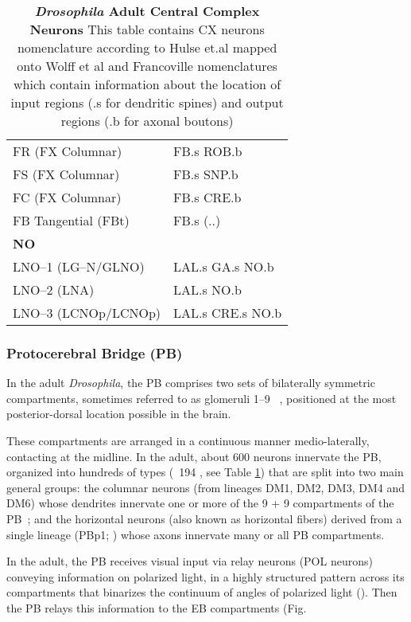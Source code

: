 \begin{table}[ht]
\begin{tabular}{l|l}
        FR (FX Columnar) & FB.s ROB.b \\
        FS (FX Columnar) & FB.s SNP.b \\
        FC (FX Columnar) & FB.s CRE.b \\
        FB Tangential (FBt) & FB.s (..) \\
        \midrule
        \multicolumn{2}{l}{\textbf{NO}} \\[2pt]
        LNO–1 (LG–N/GLNO) & LAL.s GA.s NO.b \\
        LNO–2 (LNA) & LAL.s NO.b \\
        LNO–3 (LCNOp/LCNOp) & LAL.s CRE.s NO.b \\
        \bottomrule
        \end{tabular}
        \caption[\textit{Drosophila} Adult Central Complex Neurons]{\textbf{\textit{Drosophila} Adult Central Complex Neurons} This table contains CX neurons nomenclature according to Hulse et.al \citep{hulse2021connectome} mapped onto Wolff et al\citep{wolff2018neuroarchitecture} and Francoville \citep{franconville2018building} nomenclatures which contain information about the location of input regions (.s for dendritic spines) and output regions (.b for axonal boutons)}
        \label{AdultCXneurons}
        \end{table}

        \subsubsection{Protocerebral Bridge (PB)}
        In the adult \textit{Drosophila}, the PB comprises two sets of bilaterally symmetric compartments, sometimes referred to as glomeruli 1–9 ~\cite{hulse2021connectome}, positioned at the most posterior-dorsal location possible in the brain.

        These compartments are arranged in a continuous manner medio-laterally, contacting at the midline. In the adult, about 600 neurons innervate the PB, organized into hundreds of types (~194 \citep{wolff2015neuroarchitecture}, see Table \ref{AdultCXneurons}) that are split into two main general groups: the columnar neurons (from lineages DM1, DM2, DM3, DM4 and DM6) whose dendrites innervate one or more of the 9 + 9 compartments of the PB~\citep{wolff2015neuroarchitecture}; and the horizontal neurons (also known as horizontal fibers) derived from a single lineage (PBp1; \citep{andrade2019developmentally}) whose axons innervate many or all PB compartments.

        In the adult, the PB receives visual input via relay neurons (POL neurons) conveying information on polarized light, in a highly structured pattern across its compartments that binarizes the continuum of angles of polarized light (\citep{heinze2009transformation}). Then the PB relays this information to the EB compartments (Fig. %

